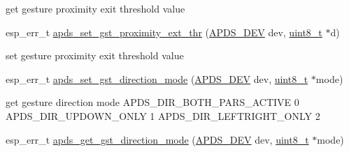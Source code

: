 \begin{DoxyCompactItemize}
\begin{DoxyCompactList}\small\item\em 
\begin{DoxyItemize}
\item get gesture proximity exit threshold value 
\end{DoxyItemize}\end{DoxyCompactList}\item 
esp\+\_\+err\+\_\+t \hyperlink{group__APDS9960__GestureFunctions_ga4cecc0f8dc5e34be6b8838d2a36d9690}{apds\+\_\+set\+\_\+gst\+\_\+proximity\+\_\+ext\+\_\+thr} (\hyperlink{structAPDS9960__Driver}{A\+P\+D\+S\+\_\+\+D\+EV} dev, \hyperlink{vl53l0x__types_8h_aba7bc1797add20fe3efdf37ced1182c5}{uint8\+\_\+t} $\ast$d)
\begin{DoxyCompactList}\small\item\em 
\begin{DoxyItemize}
\item set gesture proximity exit threshold value 
\end{DoxyItemize}\end{DoxyCompactList}\item 
esp\+\_\+err\+\_\+t \hyperlink{group__APDS9960__GestureFunctions_gabe89844ce55dddd3f1c94a62f625fcb7}{apds\+\_\+set\+\_\+gst\+\_\+direction\+\_\+mode} (\hyperlink{structAPDS9960__Driver}{A\+P\+D\+S\+\_\+\+D\+EV} dev, \hyperlink{vl53l0x__types_8h_aba7bc1797add20fe3efdf37ced1182c5}{uint8\+\_\+t} $\ast$mode)
\begin{DoxyCompactList}\small\item\em 
\begin{DoxyItemize}
\item get gesture direction mode A\+P\+D\+S\+\_\+\+D\+I\+R\+\_\+\+B\+O\+T\+H\+\_\+\+P\+A\+R\+S\+\_\+\+A\+C\+T\+I\+VE 0 A\+P\+D\+S\+\_\+\+D\+I\+R\+\_\+\+U\+P\+D\+O\+W\+N\+\_\+\+O\+N\+LY 1 A\+P\+D\+S\+\_\+\+D\+I\+R\+\_\+\+L\+E\+F\+T\+R\+I\+G\+H\+T\+\_\+\+O\+N\+LY 2 
\end{DoxyItemize}\end{DoxyCompactList}\item 
esp\+\_\+err\+\_\+t \hyperlink{group__APDS9960__GestureFunctions_ga4f70f2fb9265196987c8dfabec6bc187}{apds\+\_\+get\+\_\+gst\+\_\+direction\+\_\+mode} (\hyperlink{structAPDS9960__Driver}{A\+P\+D\+S\+\_\+\+D\+EV} dev, \hyperlink{vl53l0x__types_8h_aba7bc1797add20fe3efdf37ced1182c5}{uint8\+\_\+t} $\ast$mode)
\begin{DoxyCompactList}\small\item\em 
\begin{DoxyItemize}

\end{DoxyItemize}
\end{DoxyCompactList}
\end{DoxyCompactItemize}
